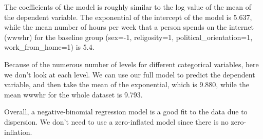 \documentclass[
  letterpaper,
  DIV=11,
  numbers=noendperiod]{scrartcl}
\begin{document}
The coefficients of the model is roughly similar to the log value of the
mean of the dependent variable. The exponential of the intercept of the
model is 5.637, while the mean number of hours per week that a person
spends on the internet (wwwhr) for the baseline group (sex=-1,
religosity=1, political\_orientation=1, work\_from\_home=1) is 5.4.

Because of the numerous number of levels for different categorical
variables, here we don't look at each level. We can use our full model
to predict the dependent variable, and then take the mean of the
exponential, which is 9.880, while the mean wwwhr for the whole dataset
is 9.793.

Overall, a negative-binomial regression model is a good fit to the data
due to dispersion. We don't need to use a zero-inflated model since
there is no zero-inflation.
\end{document}
